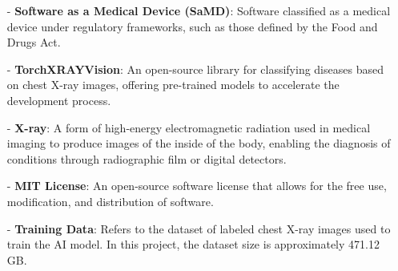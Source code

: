 \documentclass[12pt, titlepage]{article}
\begin{document}
\begin{itemize}
    \item[-] \textbf{Software as a Medical Device (SaMD)}: Software classified as a medical device under regulatory frameworks, such as those defined by the Food and Drugs Act.
    
    \item[-] \textbf{TorchXRAYVision}: An open-source library for classifying diseases based on chest X-ray images, offering pre-trained models to accelerate the development process.
    
    \item[-] \textbf{X-ray}: A form of high-energy electromagnetic radiation used in medical imaging to produce images of the inside of the body, enabling the diagnosis of conditions through radiographic film or digital detectors.
    
    \item[-] \textbf{MIT License}: An open-source software license that allows for the free use, modification, and distribution of software.
    
    \item[-] \textbf{Training Data}: Refers to the dataset of labeled chest X-ray images used to train the AI model. In this project, the dataset size is approximately 471.12 GB.
    
\end{itemize}
\end{document}
